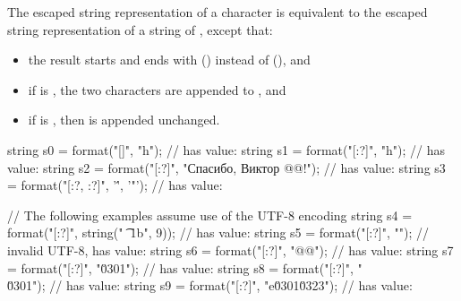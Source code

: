 \pnum
The escaped string representation of a character 
is equivalent to the escaped string representation
of a string of , except that:

\begin{itemize}
\item
the result starts and ends with  ()
instead of  (), and
\item
if  is ,
the two characters  are appended to , and
\item
if  is ,
then  is appended unchanged.
\end{itemize}

\begin{example}
\begin{codeblock}
string s0 = format("[{}]", "h\tllo");                   //  has value: \tcode{[h\ \ \ \ llo]}
string s1 = format("[{:?}]", "h\tllo");                 //  has value: 
string s2 = format("[{:?}]", "Спасибо, Виктор @@!");    //  has value: 
string s3 = format("[{:?}, {:?}]", '\'', '"');          //  has value: \tcode{['\textbackslash '', '"']}

// The following examples assume use of the UTF-8 encoding
string s4 = format("[{:?}]", string("\0 \n \t {} \x1b", 9));
                                                    //  has value: 
string s5 = format("[{:?}]", "");           // invalid UTF-8,  has value: \tcode{["\textbackslash x\{c3\}("]}
string s6 = format("[{:?}]", "@@");                 //  has value: 
string s7 = format("[{:?}]", "\u0301");             //  has value: \tcode{["\textbackslash u\{301\}"]}
string s8 = format("[{:?}]", "\\\u0301");           //  has value: 
string s9 = format("[{:?}]", "e\u0301\u0323");      //  has value: \tcode{["ẹ́"]}
\end{codeblock}
\end{example}


